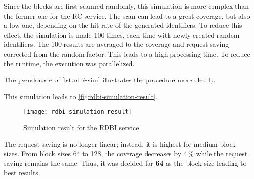 Since the blocks are first scanned randomly, this simulation is more complex than the former one for the RC service. The scan can lead to a great coverage, but also a low one, depending on the hit rate of the generated identifiers. To reduce this effect, the simulation is made 100 times, each time with newly created random identifiers. The 100 results are averaged to the coverage and request saving corrected from the random factor. This leads to a high processing time. To reduce the runtime, the execution was parallelized.

The pseudocode of \autoref{lst:rdbi-sim} illustrates the procedure more clearly.


This simulation leads to \autoref{fig:rdbi-simulation-result}.

\begin{figure}[htb]
    \centering
    \texttt{[image: rdbi-simulation-result]}
    \caption{Simulation result for the RDBI service.}
    \label{fig:rdbi-simulation-result}
\end{figure}

The request saving is no longer linear; instead, it is highest for medium block sizes. From block sizes 64 to 128, the coverage decreases by 4\,\% while the request saving remains the same. Thus, it was decided for \textbf{64} as the block size leading to best results.


